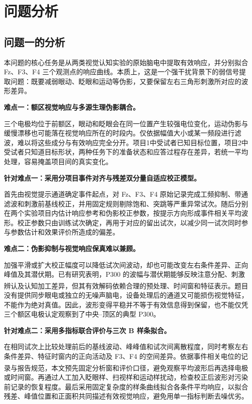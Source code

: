 \documentclass[a4paper,zihao=-4,linespread=1]{ctexart}
\numberwithin{figure}{section}       %
\newcommand{\upcite}[1]{\textsuperscript{\cite{#1}}} %
\begin{document}
\section{问题分析}

\subsection{问题一的分析}

本问题的核心任务是从两类视觉认知实验的原始脑电中提取有效响应，并分别拟合 Fz、F3、F4 三个观测点的响应曲线。本质上，这是一个强干扰背景下的弱信号提取问题：既要减弱眼动、眨眼和运动等伪影，又要保留左右三角形刺激所对应的波形差异。

\noindent\textbf{难点一：额区视觉响应与多源生理伪影耦合。}

三个电极均位于前额区，眼动和眨眼会在同一位置产生较强电位变化，运动伪影与缓慢漂移也可能落在视觉响应所在的时段内。仅依据幅值大小或某一频段进行滤波，难以将这些成分与有效响应完全分开。项目1中受试者已知目标位置，项目2中受试者只知道目标形状，两种任务下的准备状态和应答过程存在差异，若统一平均处理，容易掩盖项目间的真实变化。

\noindent\textbf{针对难点一：采用分项目事件对齐与残差双分量自适应校正模型。}

首先由视觉提示通道确定事件起点，对 Fz、F3、F4 原始记录完成工频抑制、带通滤波和刺激前基线校正，并用固定规则剔除饱和、突跳等严重异常试次。随后分别在两个实验项目内估计响应参考和伪影校正参数，按提示方向形成事件相关平均波形。校正参数只由训练试次确定，再用于对应的留出试次，以减少同一试次同时参与参数估计和效果评价所造成的偏差。

\noindent\textbf{难点二：伪影抑制与视觉响应保真难以兼顾。}

加强平滑或扩大校正幅度可以降低试次间波动，却也可能改变左右条件差异、正向峰值及其潜伏期。已有研究表明，P300 的波幅与潜伏期能够反映注意分配、刺激辨认及认知加工差异，但其有效解码依赖合理的预处理、时间窗和特征表示\upcite{lin2012p300,xia2024p300,feng2026mdd}。题目没有提供同步眼电或独立的无噪声脑电，设备处理后的通道又可能损伤视觉特征，不能作为绝对真值。因此，波形变得平稳并不等于有效信息得到保留，也不能仅凭三个额区电极认定观察到了中央--顶区的典型 P300。

\noindent\textbf{针对难点二：采用多指标联合评价与三次 B 样条拟合。}

在相同试次上比较处理前后的基线波动、峰峰值和试次间离散程度，同时考察左右条件差异、特征时窗内的正向活动及 F3、F4 的空间差异。依据事件相关电位的记录与报告规范\upcite{picton2000guidelines}，本文预先固定分析窗和评价口径，避免观察平均波形后再选择电极或时间窗。再通过人工加入眨眼样、扫视样和运动样扰动，检查校正后波形对污染前记录的恢复程度。最后采用固定复杂度的样条曲线拟合各条件平均响应，以拟合残差、峰值位置和正面积共同描述有效视觉响应，避免用单一指标判断去噪优劣。
\end{document}
